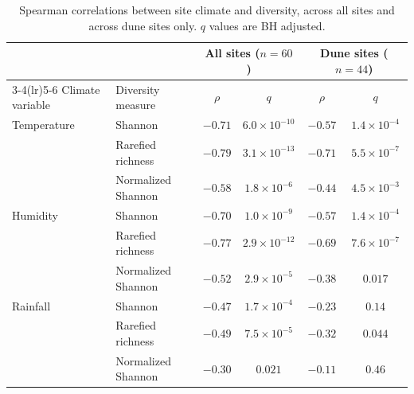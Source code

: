 \begin{table}[htbp]
\centering\footnotesize
\caption{Spearman correlations between site climate and diversity, across all
sites and across dune sites only. $q$ values are BH adjusted.}
\label{tab:landform_climate}
\begin{tabular}{llcccc}
\toprule
 & & \multicolumn{2}{c}{All sites ($n=60$)} & \multicolumn{2}{c}{Dune sites ($n=44$)} \\
\cmidrule(lr){3-4}\cmidrule(lr){5-6}
Climate variable & Diversity measure & $\rho$ & $q$ & $\rho$ & $q$ \\
\midrule
Temperature & Shannon            & $-0.71$ & $6.0\times10^{-10}$ & $-0.57$ & $1.4\times10^{-4}$ \\
            & Rarefied richness           & $-0.79$ & $3.1\times10^{-13}$ & $-0.71$ & $5.5\times10^{-7}$ \\
            & Normalized Shannon & $-0.58$ & $1.8\times10^{-6}$  & $-0.44$ & $4.5\times10^{-3}$ \\
\addlinespace
Humidity    & Shannon            & $-0.70$ & $1.0\times10^{-9}$  & $-0.57$ & $1.4\times10^{-4}$ \\
            & Rarefied richness           & $-0.77$ & $2.9\times10^{-12}$ & $-0.69$ & $7.6\times10^{-7}$ \\
            & Normalized Shannon & $-0.52$ & $2.9\times10^{-5}$  & $-0.38$ & $0.017$ \\
\addlinespace
Rainfall    & Shannon            & $-0.47$ & $1.7\times10^{-4}$  & $-0.23$ & $0.14$ \\
            & Rarefied richness           & $-0.49$ & $7.5\times10^{-5}$  & $-0.32$ & $0.044$ \\
            & Normalized Shannon & $-0.30$ & $0.021$             & $-0.11$ & $0.46$ \\
\bottomrule
\end{tabular}
\end{table}